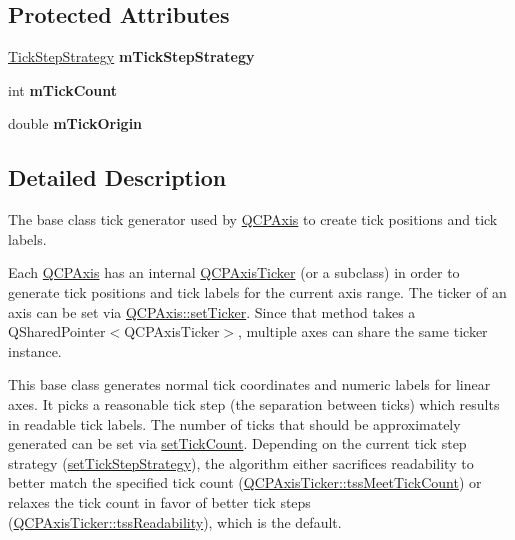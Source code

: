 \subsection*{Protected Attributes}
\begin{DoxyCompactItemize}
\item 
\mbox{\label{class_q_c_p_axis_ticker_ac059d6d670b2f6132c593fb4de156701}} 
\hyperlink{class_q_c_p_axis_ticker_ab6d2f9d9477821623ac9bc4b21ddf49a}{Tick\+Step\+Strategy} {\bfseries m\+Tick\+Step\+Strategy}
\item 
\mbox{\label{class_q_c_p_axis_ticker_a14a35b47d1aad11b08d18ea0e25937b8}} 
int {\bfseries m\+Tick\+Count}
\item 
\mbox{\label{class_q_c_p_axis_ticker_a560ef9347b1aa599a9bf0e2f29d3ec16}} 
double {\bfseries m\+Tick\+Origin}
\end{DoxyCompactItemize}


\subsection{Detailed Description}
The base class tick generator used by \hyperlink{class_q_c_p_axis}{Q\+C\+P\+Axis} to create tick positions and tick labels. 

Each \hyperlink{class_q_c_p_axis}{Q\+C\+P\+Axis} has an internal \hyperlink{class_q_c_p_axis_ticker}{Q\+C\+P\+Axis\+Ticker} (or a subclass) in order to generate tick positions and tick labels for the current axis range. The ticker of an axis can be set via \hyperlink{class_q_c_p_axis_a4ee03fcd2c74d05cd1a419b9af5cfbdc}{Q\+C\+P\+Axis\+::set\+Ticker}. Since that method takes a {\ttfamily Q\+Shared\+Pointer$<$\+Q\+C\+P\+Axis\+Ticker$>$}, multiple axes can share the same ticker instance.

This base class generates normal tick coordinates and numeric labels for linear axes. It picks a reasonable tick step (the separation between ticks) which results in readable tick labels. The number of ticks that should be approximately generated can be set via \hyperlink{class_q_c_p_axis_ticker_a47752abba8293e6dc18491501ae34008}{set\+Tick\+Count}. Depending on the current tick step strategy (\hyperlink{class_q_c_p_axis_ticker_a73b1d847c1a12159af6bfda4ebebe7d5}{set\+Tick\+Step\+Strategy}), the algorithm either sacrifices readability to better match the specified tick count (\hyperlink{class_q_c_p_axis_ticker_ab6d2f9d9477821623ac9bc4b21ddf49aa770312b6b9b0c64a37ceeba96e0cd7f2}{Q\+C\+P\+Axis\+Ticker\+::tss\+Meet\+Tick\+Count}) or relaxes the tick count in favor of better tick steps (\hyperlink{class_q_c_p_axis_ticker_ab6d2f9d9477821623ac9bc4b21ddf49aa9002aa2fd5633ab5556c71a26fed63a8}{Q\+C\+P\+Axis\+Ticker\+::tss\+Readability}), which is the default.

